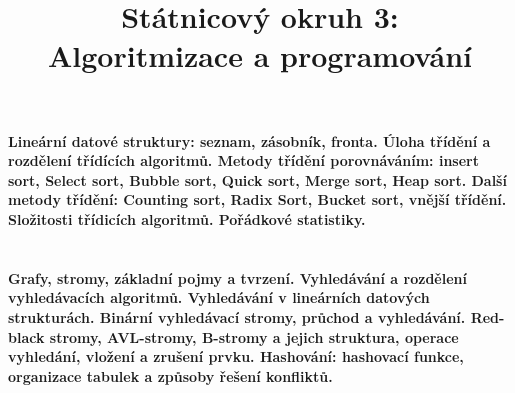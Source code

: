 \documentclass[10pt,a4paper]{article}
\begin{document}
\title{Státnicový okruh 3: \\ Algoritmizace a programování}
\maketitle
\newpage
\tableofcontents
\newpage

\section{}
\paragraph{Lineární datové struktury: seznam, zásobník, fronta. Úloha třídění a rozdělení třídících algoritmů. Metody třídění porovnáváním: insert sort, Select sort, Bubble sort, Quick sort, Merge sort, Heap sort. Další metody třídění: Counting sort, Radix Sort, Bucket sort, vnější třídění. Složitosti třídicích algoritmů. Pořádkové statistiky.}
\newpage

\section{}
\paragraph{Grafy, stromy, základní pojmy a tvrzení. Vyhledávání a rozdělení vyhledávacích algoritmů. Vyhledávání v lineárních datových strukturách. Binární vyhledávací stromy, průchod a vyhledávání. Red-black stromy, AVL-stromy, B-stromy a jejich struktura, operace vyhledání, vložení a zrušení prvku. Hashování: hashovací funkce, organizace tabulek a způsoby řešení konfliktů.}
\end{document}
